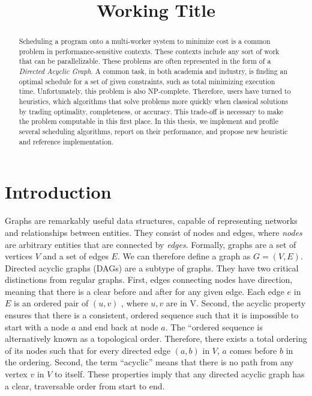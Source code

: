 \documentclass[11pt, oneside]{article}   	%
\title{Working Title}
\date{}
\begin{document}
\maketitle

\begin{abstract}

Scheduling a program onto a multi-worker system to minimize cost is a common problem in performance-sensitive contexts. These contexts include any sort of work that can be parallelizable. These problems are often represented in the form of a \emph{Directed Acyclic Graph}. A common task, in both academia and industry, is finding an optimal schedule for a set of given constraints, such as total minimizing execution time. Unfortunately, this problem is also NP-complete. Therefore, users have turned to heuristics, which algorithms that solve problems more quickly when classical solutions by trading optimality, completeness, or accuracy. This trade-off is necessary to make the problem computable in this first place. In this thesis, we implement and profile several scheduling algorithms, report on their performance, and propose new heuristic and reference implementation.

\end{abstract}

\section{Introduction}

Graphs are remarkably useful data structures, capable of representing networks and relationships between entities. They consist of nodes and edges, where \emph{nodes} are arbitrary entities that are connected by \emph{edges}. Formally, graphs are a set of vertices $V$ and a set of edges $E$. We can therefore define a graph as $G = (V, E)$. Directed acyclic graphs (DAGs) are a subtype of graphs. They have two critical distinctions from regular graphs. First, edges connecting nodes have direction, meaning that there is a clear before and after for any given edge. Each edge $e$ in $E$ is an ordered pair of $(u, v)$ , where $u, v$ are in V. Second, the acyclic property ensures that there is a consistent, ordered sequence such that it is impossible to start with a node $a$ and end back at node $a$. The ``ordered sequence is alternatively known as a topological order. Therefore, there exists a total ordering of its nodes such that for every directed edge $(a, b)$ in $V$, $a$ comes before $b$ in the ordering. Second, the term ``acyclic'' means that there is no path from any vertex $v$ in $V$ to itself. These properties imply that any directed acyclic graph has a clear, traversable order from start to end.
\end{document}
